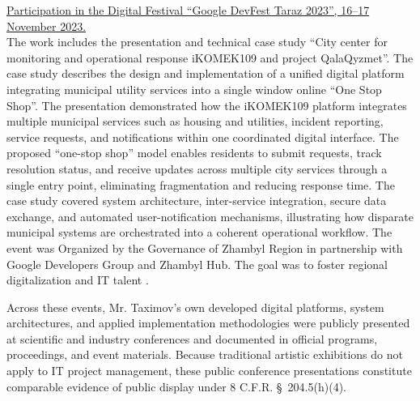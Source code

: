 \bigskip

\noindent\underline{Participation in the Digital Festival ``Google DevFest Taraz 2023'', 16--17 November 2023.} \\
The work includes the presentation and technical case study ``City center for monitoring and operational response iKOMEK109 and project QalaQyzmet''. The case study describes the design and implementation of a unified digital platform integrating municipal utility services into a single window online ``One Stop Shop''. The presentation demonstrated how the iKOMEK109 platform integrates multiple municipal services such as housing and utilities, incident reporting, service requests, and notifications within one coordinated digital interface. The proposed ``one-stop shop'' model enables residents to submit requests, track resolution status, and receive updates across multiple city services through a single entry point, eliminating fragmentation and reducing response time. The case study covered system architecture, inter-service integration, secure data exchange, and automated user-notification mechanisms, illustrating how disparate municipal systems are orchestrated into a coherent operational workflow. The event was Organized by the Governance of Zhambyl Region in partnership with Google Developers Group and Zhambyl Hub. The goal was to foster regional digitalization and IT talent .

\bigskip

Across these events, Mr. Taximov’s own developed digital platforms, system architectures, and applied implementation methodologies were publicly presented at scientific and industry conferences and documented in official programs, proceedings, and event materials. Because traditional artistic exhibitions do not apply to IT project management, these public conference presentations constitute comparable evidence of public display under 8 C.F.R. \S~204.5(h)(4).
